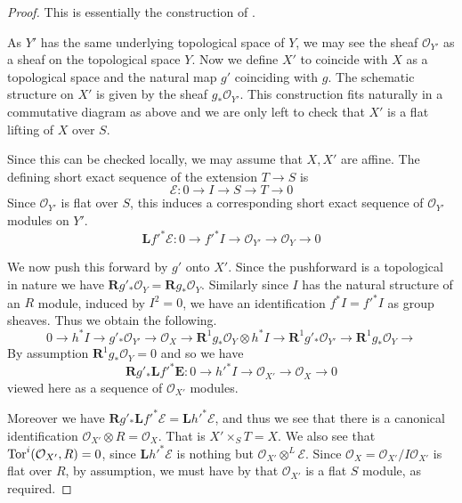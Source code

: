 \documentclass[a4paper,12pt]{book}
\newcommand{\ox}[1][X]{\mathcal{O}_{#1}}
\begin{document}
\begin{proof}
	
	This is essentially the construction of \cite[Theorem 3.1]{cynk2009small}.
	
	As $Y'$ has the same underlying topological space of $Y$, we may see the sheaf $\mathcal{O}_{Y'}$ as a sheaf on the topological space $Y$. 	
	Now we define $X'$ to coincide with $X$ as a topological space and the natural map $g'$ coinciding with $g$. The schematic structure on $X'$ is given by the sheaf $g_*\mathcal{O}_{Y'}$. 
	This construction fits naturally in a commutative diagram as above and we are only left to check that $X'$ is a flat lifting of $X$ over $S$.
	
	Since this can be checked locally, we may assume that $X, X'$ are affine.
	The defining short exact sequence of the extension $T \to S$ is
	\[\mathcal{E} \colon 0 \to I \to S \to T \to 0 \]
	Since $\mathcal{O}_{Y'}$ is flat over $S$, this induces a corresponding short exact sequence of $\ox[Y']$ modules on $Y'$.
	\[ \mathbf{L}f'^{*}\mathcal{E} \colon 0 \to f'^{*}I \to \ox[Y'] \to \ox[Y] \to 0 \]
	
	We now push this forward by $g'$ onto $X'$. Since the pushforward is a topological in nature we have $\mathbf{R}g'_{*}\ox[Y]=\mathbf{R}g_{*}\ox[Y]$. Similarly since $I$ has the natural structure of an $R$ module, induced by $I^{2}=0$, we have an identification $f^{*}I=f'^{*}I$ as group sheaves.
	Thus we obtain the following.
	\[0 \to h^{*}I \to g'_{*}\ox[Y'] \to \ox[X] \to \mathbf{R}^{1}g_{*}\ox[Y] \otimes h^{*}I \to \mathbf{R}^{1}g'_{*}\ox[Y'] \to \mathbf{R}^{1}g_{*}\ox[Y] \to \] 
	By assumption $\mathbf{R}^{1}g_{*}\ox[Y]=0$ and so we have
	\[\mathbf{R}g'_{*}\mathbf{L}f'^{*}\mathbf{E}\colon 0 \to h'^{*}I \to \ox[X'] \to \ox[X] \to 0\]
	viewed here as a sequence of $\ox[X']$ modules.
	
	Moreover we have $\mathbf{R}g'_{*}\mathbf{L}f'^{*}\mathcal{E}=\mathbf{L}h'^{*}\mathcal{E}$, and thus we see that there is a canonical identification $\ox[X']\otimes R= \ox[X]$. That is $X' \times_{S} T= X$. We also see that $\textup{Tor}^{i}(\ox[X'], R)=0$, since $\mathbf{L}h'^{*}\mathcal{E}$ is nothing but $\ox[X'] \otimes^{L} \mathcal{E}$. Since $\ox= \ox[X']/ I \ox[X']$ is flat over $R$, by assumption, we must have by \cite[\href{https://stacks.math.columbia.edu/tag/0AS8}{Tag 0AS8}]{stacks-project} that $\ox[X']$ is a flat $S$ module, as required.
	
\end{proof}
\end{document}
